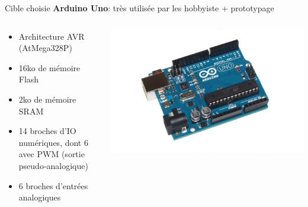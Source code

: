 \documentclass[xcolor={svgnames},aspectratio=169]{beamer}
\begin{document}
\begin{frame}{Cible choisie}
  \textbf{Arduino Uno}: très utilisée par les hobbyiste + prototypage
  \begin{columns}[T]
    \begin{column}{.65\textwidth}
      \begin{itemize}
      \item Architecture AVR (AtMega328P)
      \item 16ko de mémoire Flash
      \item 2ko de mémoire SRAM
      \item 14 broches d'IO numériques, dont 6 avec PWM (sortie pseudo-analogique)
      \item 6 broches d'entrées analogiques
      \end{itemize}
    \end{column}
    \begin{column}{.46\textwidth}
      \vspace{0.5cm}
      \includegraphics[width=.35\paperwidth]{assets/uno.jpg}
    \end{column}
  \end{columns}
\end{frame}
\end{document}
